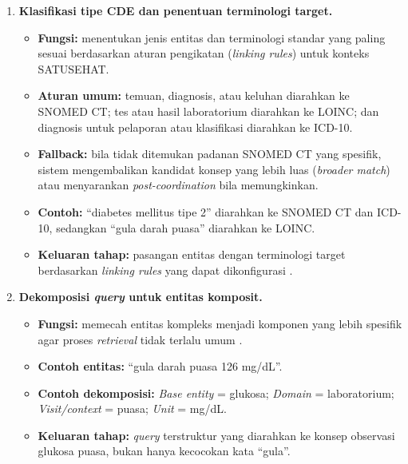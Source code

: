 \begin{enumerate}
    \item \textbf{Klasifikasi tipe CDE dan penentuan terminologi target.}
    \begin{itemize}
        \item \textbf{Fungsi:} menentukan jenis entitas dan terminologi standar yang paling sesuai berdasarkan aturan pengikatan (\textit{linking rules}) untuk konteks SATUSEHAT.
        \item \textbf{Aturan umum:} temuan, diagnosis, atau keluhan diarahkan ke SNOMED CT; tes atau hasil laboratorium diarahkan ke LOINC; dan diagnosis untuk pelaporan atau klasifikasi diarahkan ke ICD-10.
        \item \textbf{Fallback:} bila tidak ditemukan padanan SNOMED CT yang spesifik, sistem mengembalikan kandidat konsep yang lebih luas (\textit{broader match}) atau menyarankan \textit{post-coordination} bila memungkinkan.
        \item \textbf{Contoh:} ``diabetes mellitus tipe 2'' diarahkan ke SNOMED CT dan ICD-10, sedangkan ``gula darah puasa'' diarahkan ke LOINC.
        \item \textbf{Keluaran tahap:} pasangan entitas dengan terminologi target berdasarkan \textit{linking rules} yang dapat dikonfigurasi \citep{ayuningtyas_bringing_2025}.
    \end{itemize}

    \item \textbf{Dekomposisi \textit{query} untuk entitas komposit.}
    \begin{itemize}
        \item \textbf{Fungsi:} memecah entitas kompleks menjadi komponen yang lebih spesifik agar proses \textit{retrieval} tidak terlalu umum \citep{gilani_cde-mapper_2025}.
        \item \textbf{Contoh entitas:} ``gula darah puasa 126 mg/dL''.
        \item \textbf{Contoh dekomposisi:} \textit{Base entity} = glukosa; \textit{Domain} = laboratorium; \textit{Visit/context} = puasa; \textit{Unit} = mg/dL.
        \item \textbf{Keluaran tahap:} \textit{query} terstruktur yang diarahkan ke konsep observasi glukosa puasa, bukan hanya kecocokan kata ``gula''.
    \end{itemize}


\end{enumerate}
